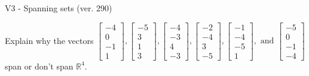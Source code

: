 \begin{exercise}
  \begin{exerciseTitle}V3 - Spanning sets (ver. 290)\end{exerciseTitle}
  \begin{exerciseStatement}
    Explain why the vectors \(\left[\begin{array}{r}
-4 \\
0 \\
-1 \\
1
\end{array}\right] , \left[\begin{array}{r}
-5 \\
3 \\
1 \\
3
\end{array}\right] , \left[\begin{array}{r}
-4 \\
-3 \\
4 \\
-3
\end{array}\right] , \left[\begin{array}{r}
-2 \\
-4 \\
3 \\
-5
\end{array}\right] , \left[\begin{array}{r}
-1 \\
-4 \\
-5 \\
1
\end{array}\right] , \text{ and } \left[\begin{array}{r}
-5 \\
0 \\
-1 \\
-4
\end{array}\right]\) span or don't span \(\mathbb{R}^4\). 
	



\end{exerciseStatement}
\end{exercise}
